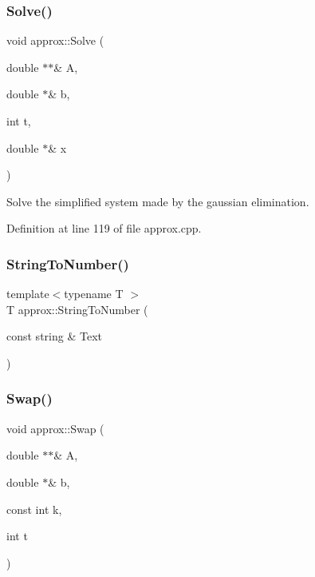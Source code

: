 \mbox{\label{classapprox_a526c22dfc3fe842580ca8ee388c28ef1}} 
\subsubsection{\texorpdfstring{Solve()}{Solve()}}
{\footnotesize\ttfamily void approx\+::\+Solve (\begin{DoxyParamCaption}\item[{double $\ast$$\ast$\&}]{A,  }\item[{double $\ast$\&}]{b,  }\item[{int}]{t,  }\item[{double $\ast$\&}]{x }\end{DoxyParamCaption})}



Solve the simplified system made by the gaussian elimination. 



Definition at line 119 of file approx.\+cpp.

\mbox{\label{classapprox_aee0082214b62e8ee5ad5194260414ad7}} 
\subsubsection{\texorpdfstring{String\+To\+Number()}{StringToNumber()}}
{\footnotesize\ttfamily template$<$typename T $>$ \\
T approx\+::\+String\+To\+Number (\begin{DoxyParamCaption}\item[{const string \&}]{Text }\end{DoxyParamCaption})}

\mbox{\label{classapprox_abdc5782a1aede87d2776dda3c4670762}} 
\subsubsection{\texorpdfstring{Swap()}{Swap()}}
{\footnotesize\ttfamily void approx\+::\+Swap (\begin{DoxyParamCaption}\item[{double $\ast$$\ast$\&}]{A,  }\item[{double $\ast$\&}]{b,  }\item[{const int}]{k,  }\item[{int}]{t }\end{DoxyParamCaption})}



